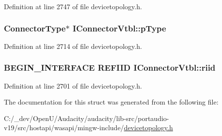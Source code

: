 Definition at line 2747 of file devicetopology.\+h.

\subsubsection[{\texorpdfstring{p\+Type}{pType}}]{ {\bf Connector\+Type}$\ast$ I\+Connector\+Vtbl\+::p\+Type}\hypertarget{struct_i_connector_vtbl_ac8ce7d9309d1c05a07c62cb7d2efd94a}{}\label{struct_i_connector_vtbl_ac8ce7d9309d1c05a07c62cb7d2efd94a}


Definition at line 2714 of file devicetopology.\+h.

\subsubsection[{\texorpdfstring{riid}{riid}}]{\setlength{\rightskip}{0pt plus 5cm}B\+E\+G\+I\+N\+\_\+\+I\+N\+T\+E\+R\+F\+A\+CE {\bf R\+E\+F\+I\+ID} I\+Connector\+Vtbl\+::riid}\hypertarget{struct_i_connector_vtbl_a130cb515391a31ac36c8308765d14e9e}{}\label{struct_i_connector_vtbl_a130cb515391a31ac36c8308765d14e9e}


Definition at line 2701 of file devicetopology.\+h.



The documentation for this struct was generated from the following file\+:\begin{DoxyCompactItemize}
\item 
C\+:/\+\_\+dev/\+Open\+U/\+Audacity/audacity/lib-\/src/portaudio-\/v19/src/hostapi/wasapi/mingw-\/include/\hyperlink{devicetopology_8h}{devicetopology.\+h}\end{DoxyCompactItemize}

